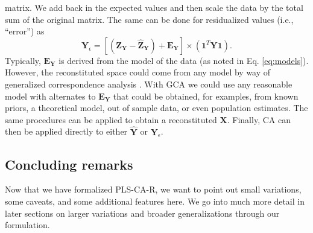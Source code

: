 \documentclass[12pt]{article}
\begin{document}
matrix. We add back in the expected values and then scale the data by
the total sum of the original matrix. The same can be done for
residualized values (i.e., ``error'') as \begin{equation}
{\mathbf Y}_{\epsilon} = [({\mathbf Z}_{\mathbf Y} - \widehat{{\mathbf Z}}_{\mathbf Y}) + {\mathbf E}_{\mathbf Y}] \times ({\mathbf 1}^{T}{\mathbf Y}{\mathbf 1}).
\label{eq:Yresid}
\end{equation} Typically, \({\mathbf E}_{\mathbf Y}\) is derived from
the model of the data (as noted in Eq. \ref{eq:models}). However, the
reconstituted space could come from any model by way of generalized
correspondence analysis
\citetext{\citealp{escofier1983analyse}; \citealp{escofier1984analyse}; \citealp[for
more details and background see also][]{beaton2018generalization}}. With
GCA we could use any reasonable model with alternates to
\({\mathbf E}_{\mathbf Y}\) that could be obtained, for examples, from
known priors, a theoretical model, out of sample data, or even
population estimates. The same procedures can be applied to obtain a
reconstituted \({\mathbf X}\). Finally, CA can then be applied directly
to either \(\widehat{\mathbf Y}\) or \({\mathbf Y}_{\epsilon}\).

\hypertarget{concluding-remarks}{%
\subsection{Concluding remarks}\label{concluding-remarks}}

Now that we have formalized PLS-CA-R, we want to point out small
variations, some caveats, and some additional features here. We go into
much more detail in later sections on larger variations and broader
generalizations through our formulation.
\end{document}
